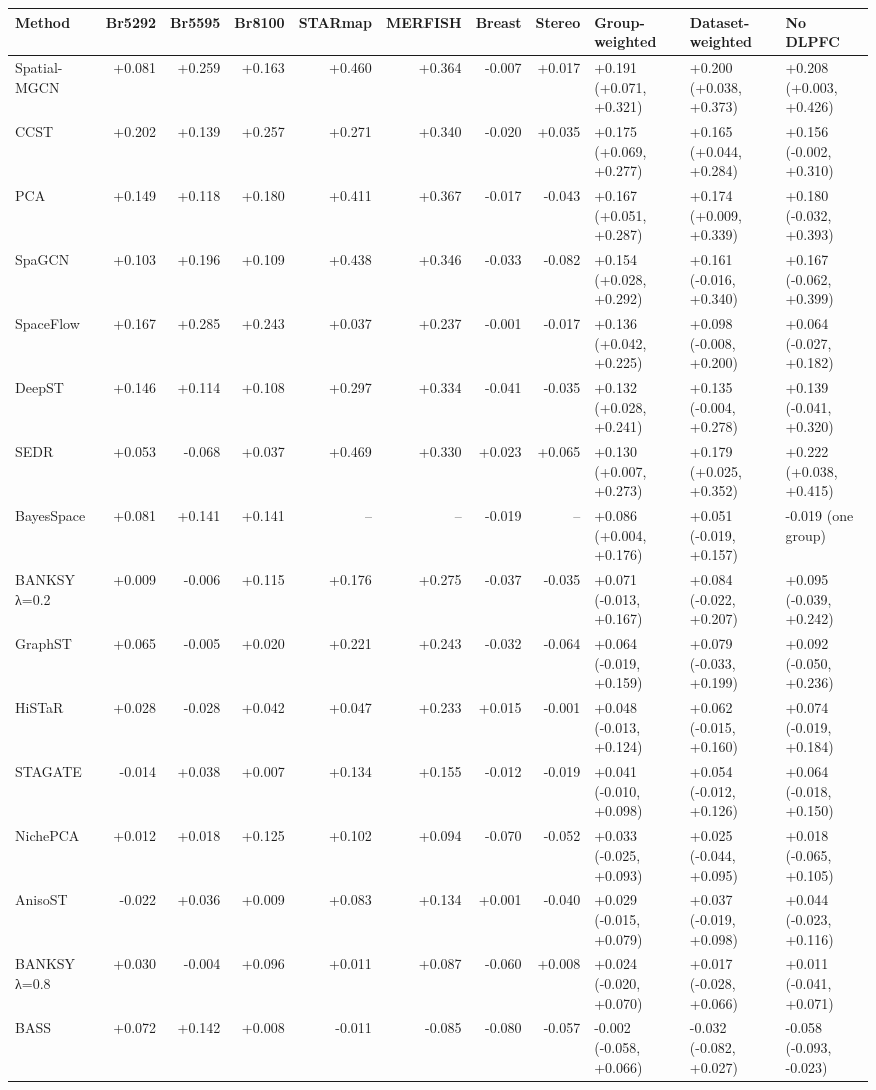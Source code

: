 \begin{tabular}{lrrrrrrrlll}\toprule
Method & Br5292 & Br5595 & Br8100 & STARmap & MERFISH & Breast & Stereo & Group-weighted & Dataset-weighted & No DLPFC \\\midrule
Spatial-MGCN & +0.081 & +0.259 & +0.163 & +0.460 & +0.364 & -0.007 & +0.017 & +0.191 (+0.071, +0.321) & +0.200 (+0.038, +0.373) & +0.208 (+0.003, +0.426) \\
CCST & +0.202 & +0.139 & +0.257 & +0.271 & +0.340 & -0.020 & +0.035 & +0.175 (+0.069, +0.277) & +0.165 (+0.044, +0.284) & +0.156 (-0.002, +0.310) \\
PCA & +0.149 & +0.118 & +0.180 & +0.411 & +0.367 & -0.017 & -0.043 & +0.167 (+0.051, +0.287) & +0.174 (+0.009, +0.339) & +0.180 (-0.032, +0.393) \\
SpaGCN & +0.103 & +0.196 & +0.109 & +0.438 & +0.346 & -0.033 & -0.082 & +0.154 (+0.028, +0.292) & +0.161 (-0.016, +0.340) & +0.167 (-0.062, +0.399) \\
SpaceFlow & +0.167 & +0.285 & +0.243 & +0.037 & +0.237 & -0.001 & -0.017 & +0.136 (+0.042, +0.225) & +0.098 (-0.008, +0.200) & +0.064 (-0.027, +0.182) \\
DeepST & +0.146 & +0.114 & +0.108 & +0.297 & +0.334 & -0.041 & -0.035 & +0.132 (+0.028, +0.241) & +0.135 (-0.004, +0.278) & +0.139 (-0.041, +0.320) \\
SEDR & +0.053 & -0.068 & +0.037 & +0.469 & +0.330 & +0.023 & +0.065 & +0.130 (+0.007, +0.273) & +0.179 (+0.025, +0.352) & +0.222 (+0.038, +0.415) \\
BayesSpace & +0.081 & +0.141 & +0.141 & -- & -- & -0.019 & -- & +0.086 (+0.004, +0.176) & +0.051 (-0.019, +0.157) & -0.019 (one group) \\
BANKSY λ=0.2 & +0.009 & -0.006 & +0.115 & +0.176 & +0.275 & -0.037 & -0.035 & +0.071 (-0.013, +0.167) & +0.084 (-0.022, +0.207) & +0.095 (-0.039, +0.242) \\
GraphST & +0.065 & -0.005 & +0.020 & +0.221 & +0.243 & -0.032 & -0.064 & +0.064 (-0.019, +0.159) & +0.079 (-0.033, +0.199) & +0.092 (-0.050, +0.236) \\
HiSTaR & +0.028 & -0.028 & +0.042 & +0.047 & +0.233 & +0.015 & -0.001 & +0.048 (-0.013, +0.124) & +0.062 (-0.015, +0.160) & +0.074 (-0.019, +0.184) \\
STAGATE & -0.014 & +0.038 & +0.007 & +0.134 & +0.155 & -0.012 & -0.019 & +0.041 (-0.010, +0.098) & +0.054 (-0.012, +0.126) & +0.064 (-0.018, +0.150) \\
NichePCA & +0.012 & +0.018 & +0.125 & +0.102 & +0.094 & -0.070 & -0.052 & +0.033 (-0.025, +0.093) & +0.025 (-0.044, +0.095) & +0.018 (-0.065, +0.105) \\
AnisoST & -0.022 & +0.036 & +0.009 & +0.083 & +0.134 & +0.001 & -0.040 & +0.029 (-0.015, +0.079) & +0.037 (-0.019, +0.098) & +0.044 (-0.023, +0.116) \\
BANKSY λ=0.8 & +0.030 & -0.004 & +0.096 & +0.011 & +0.087 & -0.060 & +0.008 & +0.024 (-0.020, +0.070) & +0.017 (-0.028, +0.066) & +0.011 (-0.041, +0.071) \\
BASS & +0.072 & +0.142 & +0.008 & -0.011 & -0.085 & -0.080 & -0.057 & -0.002 (-0.058, +0.066) & -0.032 (-0.082, +0.027) & -0.058 (-0.093, -0.023) \\
\bottomrule\end{tabular}
